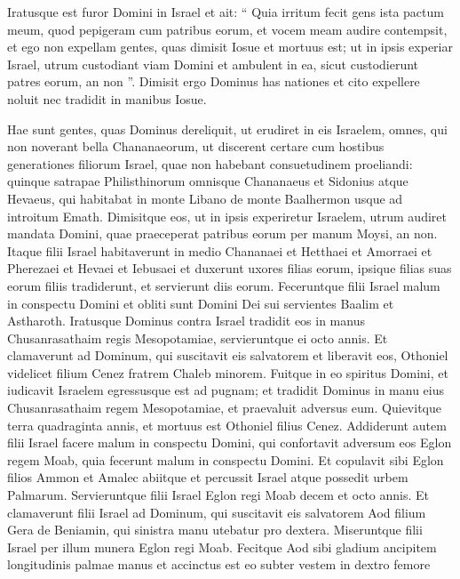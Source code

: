 \begin{biblechapter}
\begin{biblechapter}
 \verse Iratusque est furor Domini in Israel et ait: “ Quia irritum fecit gens ista pactum meum, quod pepigeram cum patribus eorum, et vocem meam audire contempsit, 
\verse et ego non expellam gentes, quas dimisit Iosue et mortuus est; 
\verse ut in ipsis experiar Israel, utrum custodiant viam Domini et ambulent in ea, sicut custodierunt patres eorum, an non ”.
 \verse Dimisit ergo Dominus has nationes et cito expellere noluit nec tradidit in manibus Iosue.
 
\begin{biblechapter}
\verse Hae sunt gentes, quas Dominus dereliquit, ut erudiret in eis Israelem, omnes, qui non noverant bella Chananaeorum, 
\verse ut discerent certare cum hostibus generationes filiorum Israel, quae non habebant consuetudinem proeliandi: 
\verse quinque satrapae Philisthinorum omnisque Chananaeus et Sidonius atque Hevaeus, qui habitabat in monte Libano de monte Baalhermon usque ad introitum Emath. 
\verse Dimisitque eos, ut in ipsis experiretur Israelem, utrum audiret mandata Domini, quae praeceperat patribus eorum per manum Moysi, an non. 
\verse Itaque filii Israel habitaverunt in medio Chananaei et Hetthaei et Amorraei et Pherezaei et Hevaei et Iebusaei 
\verse et duxerunt uxores filias eorum, ipsique filias suas eorum filiis tradiderunt, et servierunt diis eorum.
 \verse Feceruntque filii Israel malum in conspectu Domini et obliti sunt Domini Dei sui servientes Baalim et Astharoth. 
\verse Iratusque Dominus contra Israel tradidit eos in manus Chusanrasathaim regis Mesopotamiae, servieruntque ei octo annis.
 \verse Et clamaverunt ad Dominum, qui suscitavit eis salvatorem et liberavit eos, Othoniel videlicet filium Cenez fratrem Chaleb minorem.
 \verse Fuitque in eo spiritus Domini, et iudicavit Israelem egressusque est ad pugnam; et tradidit Dominus in manu eius Chusanrasathaim regem Mesopotamiae, et praevaluit adversus eum. 
\verse Quievitque terra quadraginta annis, et mortuus est Othoniel filius Cenez.
 \verse Addiderunt autem filii Israel facere malum in conspectu Domini, qui confortavit adversum eos Eglon regem Moab, quia fecerunt malum in conspectu Domini. 
\verse Et copulavit sibi Eglon filios Ammon et Amalec abiitque et percussit Israel atque possedit urbem Palmarum. 
\verse Servieruntque filii Israel Eglon regi Moab decem et octo annis.
 \verse Et clamaverunt filii Israel ad Dominum, qui suscitavit eis salvatorem Aod filium Gera de Beniamin, qui sinistra manu utebatur pro dextera. Miseruntque filii Israel per illum munera Eglon regi Moab. 
\verse Fecitque Aod sibi gladium ancipitem longitudinis palmae manus et accinctus est eo subter vestem in dextro femore 

\end{biblechapter}
\end{biblechapter}
\end{biblechapter}
